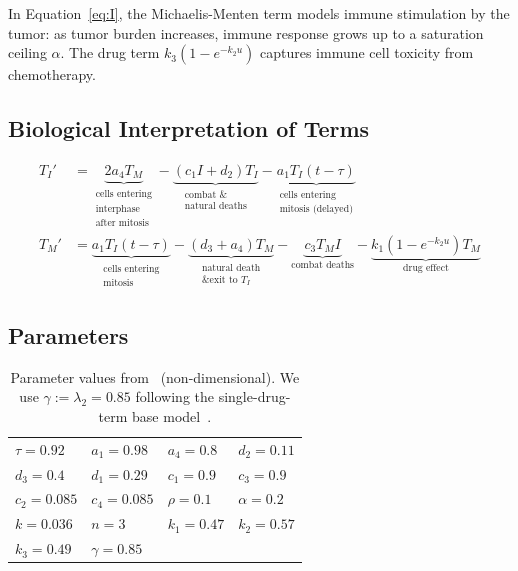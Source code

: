 In Equation~\ref{eq:I}, the Michaelis-Menten term models immune stimulation by the tumor: as tumor burden increases, immune response grows up to a saturation ceiling $\alpha$. The drug term $k_3(1-e^{-k_2u})$ captures immune cell toxicity from chemotherapy.

\subsection{Biological Interpretation of Terms}

\begin{align*}
  T_I' &= \underbrace{2a_4T_M}_{\substack{\text{cells entering}\\\text{interphase}\\\text{after mitosis}}}
         -\underbrace{(c_1I + d_2)T_I}_{\substack{\text{combat \&}\\\text{natural deaths}}}
         -\underbrace{a_1T_I(t-\tau)}_{\substack{\text{cells entering}\\\text{mitosis (delayed)}}} \\[6pt]
  T_M' &= \underbrace{a_1T_I(t-\tau)}_{\substack{\text{cells entering}\\\text{mitosis}}}
         -\underbrace{(d_3+a_4)T_M}_{\substack{\text{natural death}\\\text{\& exit to }T_I}}
         -\underbrace{c_3T_MI}_{\text{combat deaths}}
         -\underbrace{k_1(1-e^{-k_2u})T_M}_{\text{drug effect}}
\end{align*}

\subsection{Parameters}

\begin{table}[H]
  \caption{Parameter values from~\cite{villasana2004} (non-dimensional). We use
    $\gamma := \lambda_2 = 0.85$ following the single-drug-term base
    model~\cite{villasana2003}.}
  \label{tab:params}
  \small
  \begin{tabular}{llll}
    \toprule
    $\tau = 0.92$ & $a_1 = 0.98$   & $a_4 = 0.8$     & $d_2 = 0.11$  \\
    $d_3 = 0.4$   & $d_1 = 0.29$   & $c_1 = 0.9$     & $c_3 = 0.9$   \\
    $c_2 = 0.085$ & $c_4 = 0.085$  & $\rho = 0.1$    & $\alpha = 0.2$\\
    $k = 0.036$   & $n = 3$        & $k_1 = 0.47$    & $k_2 = 0.57$  \\
    $k_3 = 0.49$  & $\gamma = 0.85$&                 &               \\
    \bottomrule
  \end{tabular}
\end{table}
